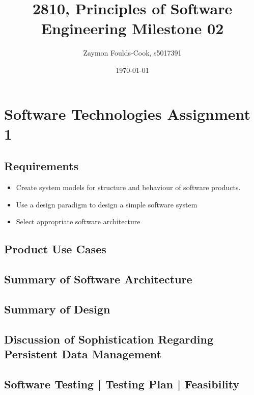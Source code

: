 \documentclass[12pt, a4]{report}
\title{2810, Principles of Software Engineering Milestone 02}
\author{Zaymon Foulds-Cook, s5017391}%
\date{\today}
\begin{document}
\begin{titlepage}
	\maketitle
\end{titlepage}

\tableofcontents
\pagebreak

%
%
\section{Software Technologies Assignment 1}
\subsection{Requirements}
\par
\begin{itemize}
	\item Create system models for structure and behaviour of software products.
	\item Use a design paradigm to design a simple software system
	\item Select appropriate software architecture
	
\end{itemize}

\subsection{Product Use Cases}
\par 

\subsection{Summary of Software Architecture}
\par 

\subsection{Summary of Design}
\par 

\subsection{Discussion of Sophistication Regarding Persistent Data Management}
\par 

\subsection{Software Testing | Testing Plan | Feasibility}
\par 
\end{document}
